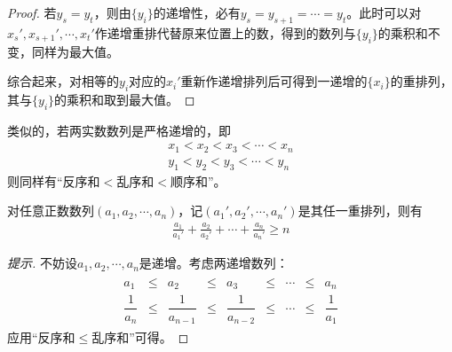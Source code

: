 \begin{proof}
  若$y_s=y_t$，则由$\{y_i\}$的递增性，必有$y_s=y_{s+1}=\cdots=y_t$。此时可以对$x_s', x_{s+1}', \cdots, x_{t}'$作递增重排代替原来位置上的数，得到的数列与$\{y_i\}$的乘积和不变，同样为最大值。
  \begin{center}
  \end{center}

  综合起来，对相等的$y_i$对应的$x_i'$重新作递增排列后可得到一递增的$\{x_i\}$的重排列，其与$\{y_i\}$的乘积和取到最大值。  
\end{proof}

\begin{theorem}
  类似的，若两实数数列是严格递增的，即
  \begin{align*}
    x_1< x_2 < x_3 < \cdots < x_n\\
    y_1< y_2 < y_3 < \cdots < y_n
  \end{align*}
  则同样有“反序和$<$乱序和$<$顺序和”。
\end{theorem}

\begin{corollary}
  对任意正数数列$(a_1,a_2,\cdots, a_n)$，记$(a_1',a_2',\cdots,a_n')$是其任一重排列，则有
  \begin{align*}
    \frac{a_1}{a_1'} + \frac{a_2}{a_2'} + \cdots + \frac{a_n}{a_n'}\ge n
  \end{align*}
\end{corollary}
\begin{proof}[提示]
  不妨设$a_1,a_2,\cdots,a_n$是递增。考虑两递增数列：
  \begin{align*}
    \begin{array}{ccccccccc}
      a_1&\le& a_2&\le& a_3&\le&\cdots&\le& a_n\\
      \dfrac1{a_n}&\le& \dfrac1{a_{n-1}}&\le& \dfrac1{a_{n-2}}&\le&\cdots&\le& \dfrac1{a_1}
    \end{array}
  \end{align*}
  应用“反序和$\le$乱序和”可得。
\end{proof}

